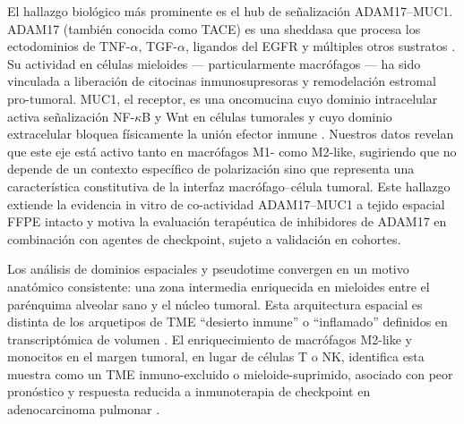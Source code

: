 \documentclass[12pt,a4paper]{article}
\begin{document}
El hallazgo biológico más prominente es el hub de señalización ADAM17--MUC1. ADAM17 (también conocida como TACE) es una sheddasa que procesa los ectodominios de TNF-$\alpha$, TGF-$\alpha$, ligandos del EGFR y múltiples otros sustratos \citep{lambrecht2018adam17}. Su actividad en células mieloides --- particularmente macrófagos --- ha sido vinculada a liberación de citocinas inmunosupresoras y remodelación estromal pro-tumoral. MUC1, el receptor, es una oncomucina cuyo dominio intracelular activa señalización NF-$\kappa$B y Wnt en células tumorales y cuyo dominio extracelular bloquea físicamente la unión efector inmune \citep{nath2013muc1}. Nuestros datos revelan que este eje está activo tanto en macrófagos M1- como M2-like, sugiriendo que no depende de un contexto específico de polarización sino que representa una característica constitutiva de la interfaz macrófago--célula tumoral. Este hallazgo extiende la evidencia in vitro de co-actividad ADAM17--MUC1 a tejido espacial FFPE intacto y motiva la evaluación terapéutica de inhibidores de ADAM17 en combinación con agentes de checkpoint, sujeto a validación en cohortes.

Los análisis de dominios espaciales y pseudotime convergen en un motivo anatómico consistente: una zona intermedia enriquecida en mieloides entre el parénquima alveolar sano y el núcleo tumoral. Esta arquitectura espacial es distinta de los arquetipos de TME ``desierto inmune'' o ``inflamado'' definidos en transcriptómica de volumen \citep{chen2016elements}. El enriquecimiento de macrófagos M2-like y monocitos en el margen tumoral, en lugar de células T o NK, identifica esta muestra como un TME inmuno-excluido o mieloide-suprimido, asociado con peor pronóstico y respuesta reducida a inmunoterapia de checkpoint en adenocarcinoma pulmonar \citep{cassetta2020targeting, wu2021single}.
\end{document}
